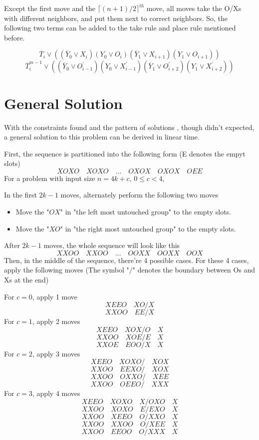 \documentclass{article}
\begin{document}
        Except the first move and the $\lceil (n+1)/2\rceil^{th}$ move, all moves
        take the O/Xs with different neighbors,
        and put them next to correct neighbors.
        So, the following two terms can be added 
        to the take rule and place rule mentioned before.

        $$
        \overline T_i \lor 
        (
        (\overline Y_0\lor X_i)
        (Y_0\lor O_i)
        (\overline Y_1\lor X_{i+1})
        (Y_1\lor O_{i+1})
        )
        $$
        $$
        \overline T_i^{m-1} \lor 
        (
        (\overline Y_0\lor O_{i-1}^\prime)
        (Y_0\lor X_{i-1}^\prime)
        (\overline Y_1\lor O_{i+2}^\prime)
        (Y_1\lor X_{i+2}^\prime)
        )
        $$

    \section{General Solution}

    With the constraints found and the pattern of solutions
    , though didn't expected, a general solution to this
    problem can be derived in linear time.

    First, the sequence is partitioned into the following form (E denotes the empyt slots)
    $$XOXO\quad XOXO\quad \dots\quad OXOX\quad OXOX\quad OEE$$
    For a problem with input size $n=4k+c$, $0\leq c < 4$,

    In the first $2k-1$ moves, alternately perform the following two moves
    \begin{itemize}
        \item Move the "$OX$" in "the left most untouched group" to the empty slots.
        \item Move the "$XO$" in "the right most untouched group" to the empty slots.
    \end{itemize}
    After $2k-1$ moves, the whole sequence will look like this
    $$XXOO\quad XXOO\quad \dots\quad OOXX\quad OOXX\quad OOX$$
    Then, in the middle of the sequence, there're 4 possible cases. For these
    4 cases, apply the following moves 
    (The symbol "$/$" denotes the boundary between Os and Xs at the end)

    For $c=0$, apply 1 move
    $$XEEO\quad XO/X$$
    $$XXOO\quad EE/X$$
    For $c=1$, apply 2 moves
    $$XEEO\quad XOX/O\quad X$$
    $$XXOO\quad XOE/E\quad X$$
    $$XXOE\quad EOO/X\quad X$$
    For $c=2$, apply 3 moves
    $$XEEO\quad XOXO/\quad XOX$$
    $$XXOO\quad EEXO/\quad XOX$$
    $$XXOO\quad OXXO/\quad XEE$$
    $$XXOO\quad OEEO/\quad XXX$$
    For $c=3$, apply 4 moves
    $$XEEO\quad XOXO\quad X/OXO\quad X$$
    $$XXOO\quad XOXO\quad E/EXO\quad X$$
    $$XXOO\quad XEEO\quad O/XXO\quad X$$
    $$XXOO\quad XXOO\quad O/XEE\quad X$$
    $$XXOO\quad EEOO\quad O/XXX\quad X$$
\end{document}
